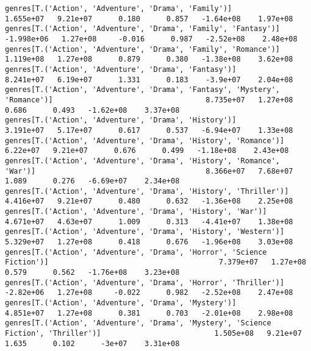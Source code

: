 \documentclass[11pt]{article}
\begin{document}
\begin{Verbatim}[commandchars=\\\{\}]
genres[T.('Action', 'Adventure', 'Drama', 'Family')]                                                          1.655e+07   9.21e+07      0.180      0.857   -1.64e+08    1.97e+08
genres[T.('Action', 'Adventure', 'Drama', 'Family', 'Fantasy')]                                              -1.998e+06   1.27e+08     -0.016      0.987   -2.52e+08    2.48e+08
genres[T.('Action', 'Adventure', 'Drama', 'Family', 'Romance')]                                               1.119e+08   1.27e+08      0.879      0.380   -1.38e+08    3.62e+08
genres[T.('Action', 'Adventure', 'Drama', 'Fantasy')]                                                         8.241e+07   6.19e+07      1.331      0.183    -3.9e+07    2.04e+08
genres[T.('Action', 'Adventure', 'Drama', 'Fantasy', 'Mystery', 'Romance')]                                   8.735e+07   1.27e+08      0.686      0.493   -1.62e+08    3.37e+08
genres[T.('Action', 'Adventure', 'Drama', 'History')]                                                         3.191e+07   5.17e+07      0.617      0.537   -6.94e+07    1.33e+08
genres[T.('Action', 'Adventure', 'Drama', 'History', 'Romance')]                                               6.22e+07   9.21e+07      0.676      0.499   -1.18e+08    2.43e+08
genres[T.('Action', 'Adventure', 'Drama', 'History', 'Romance', 'War')]                                       8.366e+07   7.68e+07      1.089      0.276   -6.69e+07    2.34e+08
genres[T.('Action', 'Adventure', 'Drama', 'History', 'Thriller')]                                             4.416e+07   9.21e+07      0.480      0.632   -1.36e+08    2.25e+08
genres[T.('Action', 'Adventure', 'Drama', 'History', 'War')]                                                  4.671e+07   4.63e+07      1.009      0.313   -4.41e+07    1.38e+08
genres[T.('Action', 'Adventure', 'Drama', 'History', 'Western')]                                              5.329e+07   1.27e+08      0.418      0.676   -1.96e+08    3.03e+08
genres[T.('Action', 'Adventure', 'Drama', 'Horror', 'Science Fiction')]                                       7.379e+07   1.27e+08      0.579      0.562   -1.76e+08    3.23e+08
genres[T.('Action', 'Adventure', 'Drama', 'Horror', 'Thriller')]                                              -2.82e+06   1.27e+08     -0.022      0.982   -2.52e+08    2.47e+08
genres[T.('Action', 'Adventure', 'Drama', 'Mystery')]                                                         4.851e+07   1.27e+08      0.381      0.703   -2.01e+08    2.98e+08
genres[T.('Action', 'Adventure', 'Drama', 'Mystery', 'Science Fiction', 'Thriller')]                          1.505e+08   9.21e+07      1.635      0.102      -3e+07    3.31e+08

\end{Verbatim}
\end{document}
